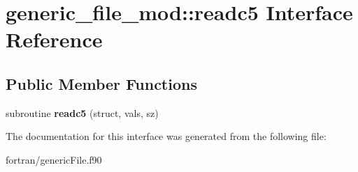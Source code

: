 \hypertarget{interfacegeneric__file__mod_1_1readc5}{}\section{generic\+\_\+file\+\_\+mod\+:\+:readc5 Interface Reference}
\label{interfacegeneric__file__mod_1_1readc5}
\subsection*{Public Member Functions}
\begin{DoxyCompactItemize}
\item 
\mbox{\label{interfacegeneric__file__mod_1_1readc5_adc43478d29ff78de7ae29701267dcc4b}} 
subroutine {\bfseries readc5} (struct, vals, sz)
\end{DoxyCompactItemize}


The documentation for this interface was generated from the following file\+:\begin{DoxyCompactItemize}
\item 
fortran/generic\+File.\+f90\end{DoxyCompactItemize}
